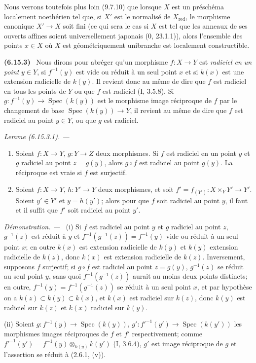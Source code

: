 \documentclass[10pt,oneside]{book}
\newcommand{\oldpage}[2][]{%
  \setcounter{footnote}{0}%
  \marginpar{\scriptsize\textbf{#1}~|~#2}\ignorespaces}
\newenvironment{env}[1][]{\par\medskip\noindent\textbf{(#1)}\ }{\par}
\newenvironment{lemma}[1][]{%
  \par\medskip\noindent\itshape Lemme (#1). ---\ }{\par}
\newenvironment{proof}{%
  \par\medskip\noindent\textit{Démonstration. ---\ }}{\par}
\begin{document}
Nous verrons toutefois plus loin (9.7.10) que lorsque $X$ est un préschéma
localement noethérien tel que, si $X'$ est le normalisé de
$X_{\mathrm{red}}$, le morphisme canonique $X'\to X$ soit fini (ce qui sera
le cas si $X$ est tel que les anneaux de ses ouverts affines soient
universellement japonais (0, 23.1.1)), alors l'ensemble des points $x\in X$
où $X$ est géométriquement unibranche est localement constructible.

\begin{env}[6.15.3]
\label{IV.2.s6.15.3-fr}
Nous dirons pour abréger qu'un morphisme $f:X\to Y$ est \emph{radiciel en
un point} $y\in Y$, si $f^{-1}(y)$ est vide ou réduit à un seul point $x$
et si $k(x)$ est une extension radicielle de $k(y)$. Il revient donc au
même de dire que $f$ est radiciel en tous les points de $Y$ ou que $f$ est
radiciel (I, 3.5.8). Si
$g:f^{-1}(y)\to\operatorname{Spec}(k(y))$ est le morphisme image réciproque
de $f$ par le changement de base
$\operatorname{Spec}(k(y))\to Y$, il revient au même de dire que $f$ est
radiciel au point $y\in Y$, ou que $g$ est radiciel.
\end{env}

\begin{lemma}[6.15.3.1]
\label{IV.2.s6.15.3.1-fr}
\begin{enumerate}
\item[(i)] Soient $f:X\to Y$, $g:Y\to Z$ deux morphismes. Si $f$ est
radiciel en un point $y$ et $g$ radiciel au point $z=g(y)$, alors $g\circ f$
est radiciel au point $g(y)$. La réciproque est vraie si $f$ est surjectif.
\item[(ii)] Soient $f:X\to Y$, $h:Y'\to Y$ deux morphismes, et soit
$f'=f_{(Y')}:X\times_Y Y'\to Y'$. Soient $y'\in Y'$ et $y=h(y')$; alors
pour que $f$ soit radiciel au point $y$, il faut et il suffit que $f'$ soit
radiciel au point $y'$.
\end{enumerate}
\end{lemma}

\begin{proof}
\oldpage[IV-2]{178}
(i) Si $f$ est radiciel au point $y$ et $g$ radiciel au point $z$,
$g^{-1}(z)$ est réduit à $y$ et
$f^{-1}(g^{-1}(z))=f^{-1}(y)$ vide ou réduit à un seul point $x$; en
outre $k(x)$ est extension radicielle de $k(y)$ et $k(y)$ extension
radicielle de $k(z)$, donc $k(x)$ est extension radicielle de $k(z)$.
Inversement, supposons $f$ surjectif; si $g\circ f$ est radiciel au point
$z=g(y)$, $g^{-1}(z)$ se réduit au seul point $y$, sans quoi
$f^{-1}(g^{-1}(z))$ aurait au moins deux points distincts; en outre,
$f^{-1}(y)=f^{-1}(g^{-1}(z))$ se réduit à un seul point $x$, et par
hypothèse on a $k(z)\subset k(y)\subset k(x)$, et $k(x)$ est radiciel sur
$k(z)$, donc $k(y)$ est radiciel sur $k(z)$ et $k(x)$ radiciel sur $k(y)$.

(ii) Soient $g:f^{-1}(y)\to\operatorname{Spec}(k(y))$,
$g':f'^{-1}(y')\to\operatorname{Spec}(k(y'))$ les morphismes images
réciproques de $f$ et $f'$ respectivement; comme
$f'^{-1}(y')=f^{-1}(y)\otimes_{k(y)}k(y')$ (I, 3.6.4), $g'$ est image
réciproque de $g$ et l'assertion se réduit à (2.6.1, (v)).
\end{proof}
\end{document}
